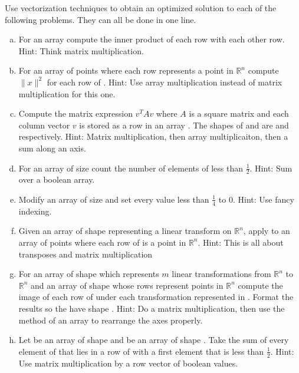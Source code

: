 \begin{problem}
Use vectorization techniques to obtain an optimized solution to each of the following problems.
They can all be done in one line.

\begin{enumerate}[a)]

\item For an array  compute the inner product of each row with each other row.
Hint: Think matrix multiplication.

\item For an array of points  where each row represents a point in $\mathbb{R}^n$ compute $\| x\|^2$ for each row  of .
Hint: Use array multiplication instead of matrix multiplication for this one.

\item Compute the matrix expression $v^T A v$ where $A$ is a square matrix and each column vector $v$ is stored as a row in an array .
The shapes of  and  are  and  respectively.
Hint: Matrix multiplication, then array multiplicaiton, then a sum along an axis.

\item For an array  of size  count the number of elements of  less than $\frac{1}{2}$.
Hint: Sum over a boolean array.

\item Modify an array  of size  and set every value less than $\frac{1}{4}$ to $0$.
Hint: Use fancy indexing.

\item Given an array  of shape  representing a linear transform on $\mathbb{R}^n$, apply  to an array of points  where each row of  is a point in $\mathbb{R}^n$.
Hint: This is all about transposes and matrix multiplication

\item For an array  of shape  which represents $m$ linear transformations from $\mathbb{R}^n$ to $\mathbb{R}^n$ and an array  of shape  whose rows represent points in $\mathbb{R}^n$ compute the image of each row of  under each transformation represented in .
Format the results so the have shape .
Hint: Do a matrix multiplication, then use the  method of an array to rearrange the axes properly.

\item Let  be an array of shape  and  be an array of shape .
Take the sum of every element of  that lies in a row of  with a first element that is less than $\frac{1}{2}$.
Hint: Use matrix multiplication by a row vector of boolean values.


\end{enumerate}
\end{problem}
